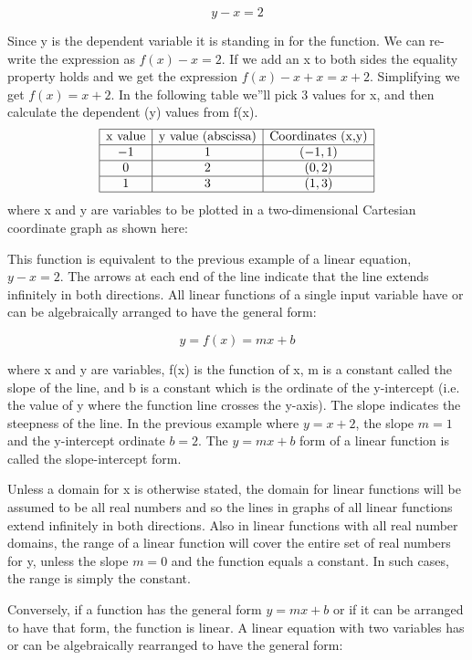 \[
y - x = 2
\]

Since y is the dependent variable it is standing in for the function. We can re-write the expression as $f(x) - x = 2$. If we add an x to both sides the equality property holds and we get the expression $f(x) - x + x = x + 2$. Simplifying we get $f(x) = x + 2$. In the following table we''ll pick 3 values for x, and then calculate the dependent (y) values from f(x).
\[
\begin{array}{|c|c|c|}
\hline
\text{x value} & \text{y value (abscissa)} & \text{Coordinates (x,y)} \\ 
\hline
-1 & 1 & (-1, 1) \\ 
\hline
0 & 2 & (0, 2) \\ 
\hline
1 & 3 & (1, 3) \\ 
\hline
\end{array}
\]
where x and y are variables to be plotted in a two-dimensional Cartesian coordinate graph
as shown here:



This function is equivalent to the previous example of a linear equation, $y - x = 2$. The arrows at each end of the line indicate that the line extends infinitely in both directions. All linear functions of a single input variable have or can be algebraically arranged to have the general form:

\[
y = f(x) = mx + b
\]

where x and y are variables, f(x) is the function of x, m is a constant called the slope of the line, and b is a constant which is the ordinate of the y-intercept (i.e. the value of y where the function line crosses the y-axis). The slope indicates the steepness of the line. In the previous example where $y = x + 2$, the slope $m = 1$ and the y-intercept ordinate $b = 2$. The $y = mx + b$ form of a linear function is called the slope-intercept form.

Unless a domain for x is otherwise stated, the domain for linear functions will be assumed to be all real numbers and so the lines in graphs of all linear functions extend infinitely in both directions. Also in linear functions with all real number domains, the range of a linear function will cover the entire set of real numbers for y, unless the slope $m = 0$ and the function equals a constant. In such cases, the range is simply the constant.

Conversely, if a function has the general form $y = mx + b$ or if it can be arranged to have that form, the function is linear. A linear equation with two variables has or can be algebraically rearranged to have the general form:

